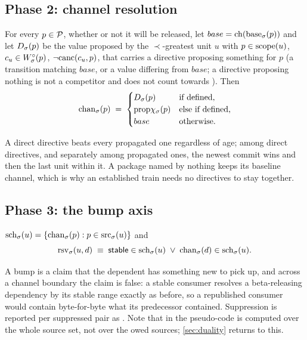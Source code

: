 \subsection{Phase 2: channel resolution}

\begin{definition}
\label{def:channels}
For every $p \in \mathcal{P}$, whether or not it will be released, let $base =
\mathrm{ch}(\mathrm{base}_{\sigma}(p))$ and let $D_{\sigma}(p)$ be the value proposed by the
$\prec$-greatest unit $u$ with $p \in \mathrm{scope}(u)$, $c_{u} \in W^{\circ}_{\sigma}(p)$,
$\lnot\mathrm{canc}(c_{u},p)$, that carries a  directive proposing
something for $p$ (a transition matching $base$, or a value differing from
$base$; a directive proposing nothing is not a competitor and does not count
towards ). Then
\[
  \mathrm{chan}_{\sigma}(p) \;=\;
  \begin{cases}
    D_{\sigma}(p) & \text{if defined,}\\
    \mathrm{prop}\chi_{\sigma}(p) & \text{else if defined,}\\
    base & \text{otherwise.}
  \end{cases}
\]
\end{definition}

A direct directive beats every propagated one regardless of age; among direct
directives, and separately among propagated ones, the newest commit wins and
then the last unit within it. A package named by nothing keeps its baseline
channel, which is why an established train needs no directives to stay
together.

\subsection{Phase 3: the bump axis}

\begin{definition}
\label{def:resolvable}
$\mathrm{sch}_{\sigma}(u) = \{\mathrm{chan}_{\sigma}(p) : p \in \mathrm{src}_{\sigma}(u)\}$ and
\[
  \mathrm{rsv}_{\sigma}(u,d) \;\equiv\;
  \mathsf{stable} \in \mathrm{sch}_{\sigma}(u) \;\lor\; \mathrm{chan}_{\sigma}(d) \in \mathrm{sch}_{\sigma}(u).
\]
\end{definition}

A bump is a claim that the dependent has something new to pick up, and across a
channel boundary the claim is false: a stable consumer resolves a
beta-releasing dependency by its stable range exactly as before, so a
republished consumer would contain byte-for-byte what its predecessor
contained. Suppression is reported per suppressed pair as . Note
that  in the pseudo-code is computed over the whole source set,
not over the owed sources; \cref{sec:duality} returns to this.

